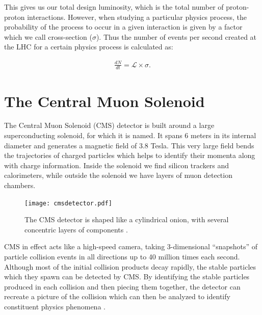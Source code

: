 This gives us our total design luminosity, which is the total number of proton-proton interactions. However, when studying a particular physics process, the probability of the process to occur in a given interaction is given by a factor which we call cross-section ($\sigma$). Thus the number of events per second created at the LHC for a certain physics process is calculated as:

\begin{equation}
\label{eq:crosssection}
\begin{gathered}
\frac{dN}{dt} = \mathcal{L} \times \sigma.
\end{gathered}
\end{equation}



\section{The Central Muon Solenoid}
The Central Muon Solenoid (CMS) detector is built around a large superconducting solenoid, for which it is named. It spans 6 meters in its internal diameter and generates a magnetic field of 3.8 Tesla. This very large field bends the trajectories of charged particles which helps to identify their momenta along with charge information. Inside the solenoid we find silicon trackers and calorimeters, while outside the solenoid we have layers of muon detection chambers.

\begin{figure}[!ht]
\begin{center}
    \texttt{[image: cmsdetector.pdf]}
    \caption{The CMS detector is shaped like a cylindrical onion, with several concentric layers of components \cite{CMS}.}
    \label{fig:cmscutaway1}
\end{center}
\end{figure}

CMS in effect acts like a high-speed camera, taking 3-dimensional ``snapshots'' of particle collision events in all directions up to 40 million times each second. Although most of the initial collision products decay rapidly, the stable particles which they spawn can be detected by CMS. By identifying the stable particles produced in each collision and then piecing them together, the detector can recreate a picture of the collision which can then be analyzed to identify constituent physics phenomena \cite{Karimaki:368412, CERN-LHCC-2000-016, Chatrchyan:1129810, Collaboration:2745805, CERN-LHCC-2017-009}.

